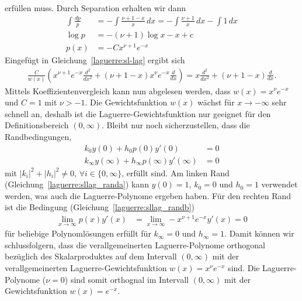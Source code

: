 erfüllen muss.
Durch Separation erhalten wir dann
\begin{align*}
\int \frac{dp}{p}
 & =
-\int \frac{\nu + 1 - x}{x} \, dx
=
-\int \frac{\nu + 1}{x} \, dx - \int 1\, dx
\\
\log p
 & =
-(\nu + 1)\log x - x + c
\\
p(x)
 & =
-C x^{\nu + 1} e^{-x}
\end{align*}
Eingefügt in Gleichung~\eqref{laguerre:sl-lag} ergibt sich
\begin{align*}
\frac{C}{w(x)}
\left(
x^{\nu+1} e^{-x} \frac{d^2}{dx^2} +
(\nu + 1 - x) x^{\nu} e^{-x} \frac{d}{dx}
\right)
=
x \frac{d^2}{dx^2} + (\nu + 1 - x) \frac{d}{dx}.
\end{align*}
Mittels Koeffizientenvergleich kann nun abgelesen werden, dass $w(x) = x^\nu
e^{-x}$ und $C=1$ mit $\nu > -1$.
Die Gewichtsfunktion $w(x)$ wächst für $x\rightarrow-\infty$ sehr schnell an,
deshalb ist die Laguerre-Gewichtsfunktion nur geeignet für den
Definitionsbereich $(0, \infty)$.
Bleibt nur noch sicherzustellen, dass die Randbedingungen,
\begin{align}
k_0 y(0) + h_0 p(0)y'(0)
 & =
0
\label{laguerre:sllag_randa}
\\
k_\infty y(\infty) + h_\infty p(\infty) y'(\infty)
 & =
0
\label{laguerre:sllag_randb}
\end{align}
mit $|k_i|^2 + |h_i|^2 \neq 0,\,\forall i \in \{0, \infty\}$, erfüllt sind.
Am linken Rand (Gleichung~\eqref{laguerre:sllag_randa}) kann $y(0) = 1$, $k_0 =
0$ und $h_0 = 1$ verwendet werden,
was auch die Laguerre-Polynome ergeben haben.
Für den rechten Rand ist die Bedingung (Gleichung~\eqref{laguerre:sllag_randb})
\begin{align*}
\lim_{x \rightarrow \infty} p(x) y'(x)
 & =
\lim_{x \rightarrow \infty} -x^{\nu + 1} e^{-x} y'(x)
=
0
\end{align*}
für beliebige Polynomlösungen erfüllt für $k_\infty=0$ und $h_\infty=1$.
Damit können wir schlussfolgern, dass die verallgemeinerten Laguerre-Polynome
orthogonal bezüglich des Skalarproduktes auf dem Intervall $(0, \infty)$
mit der verallgemeinerten Laguerre\--Gewichtsfunktion $w(x)=x^\nu e^{-x}$ sind.
Die Laguerre-Polynome ($\nu=0$) sind somit orthognal im Intervall $(0, \infty)$
mit der Gewichtsfunktion $w(x)=e^{-x}$.



